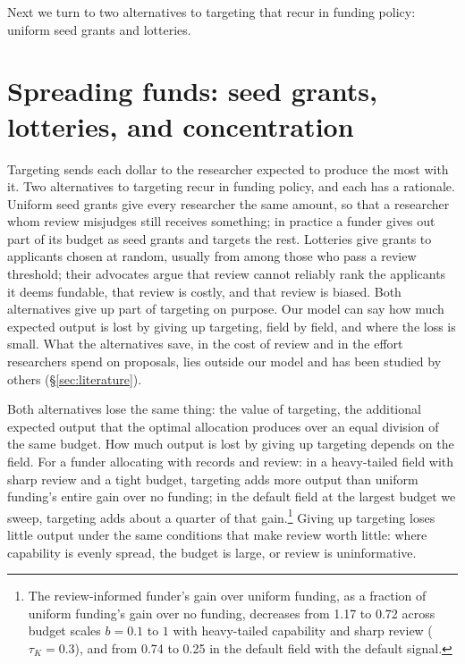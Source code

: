\documentclass[article, 11pt, reqno]{amsart}
\theoremstyle{named}
\begin{document}


Next we turn to two alternatives to targeting that recur in funding policy: uniform seed grants and lotteries.

\section{Spreading funds: seed grants, lotteries, and concentration}\label{sec:egalitarian}

Targeting sends each dollar to the researcher expected to produce the most with it. Two alternatives to targeting recur in funding policy, and each has a rationale. Uniform seed grants give every researcher the same amount, so that a researcher whom review misjudges still receives something; in practice a funder gives out part of its budget as seed grants and targets the rest. Lotteries give grants to applicants chosen at random, usually from among those who pass a review threshold; their advocates argue that review cannot reliably rank the applicants it deems fundable, that review is costly, and that review is biased. Both alternatives give up part of targeting on purpose. Our model can say how much expected output is lost by giving up targeting, field by field, and where the loss is small. What the alternatives save, in the cost of review and in the effort researchers spend on proposals, lies outside our model and has been studied by others (\S\ref{sec:literature}).

Both alternatives lose the same thing: the value of targeting, the additional expected output that the optimal allocation produces over an equal division of the same budget. How much output is lost by giving up targeting depends on the field. For a funder allocating with records and review: in a heavy-tailed field with sharp review and a tight budget, targeting adds more output than uniform funding's entire gain over no funding; in the default field at the largest budget we sweep, targeting adds about a quarter of that gain.\footnote{The review-informed funder's gain over uniform funding, as a fraction of uniform funding's gain over no funding, decreases from 1.17 to 0.72 across budget scales $b = 0.1$ to $1$ with heavy-tailed capability and sharp review ($\tau_K = 0.3$), and from 0.74 to 0.25 in the default field with the default signal.} Giving up targeting loses little output under the same conditions that make review worth little: where capability is evenly spread, the budget is large, or review is uninformative.
\end{document}
